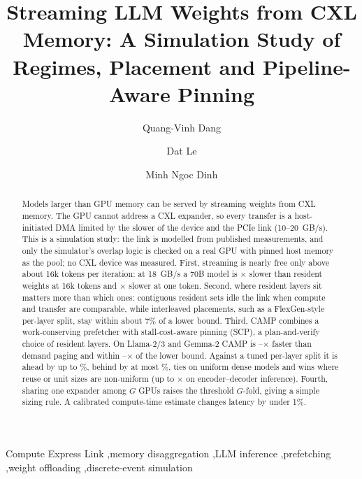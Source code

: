 \documentclass[preprint,12pt]{elsarticle}
\newcommand{\camp}{\textsc{CAMP}}
\begin{document}
\begin{frontmatter}

\title{Streaming LLM Weights from CXL Memory: A Simulation Study of Regimes, Placement and Pipeline-Aware Pinning}

\author[buv]{Quang-Vinh Dang}
\author[uef]{Dat Le}
\author[mil]{Minh Ngoc Dinh}
\address[buv]{British University Vietnam, Hung Yen, Vietnam}
\address[uef]{Department of Science, Technology, and International Projects, Ho Chi Minh City University of Economics and Finance, Ho Chi Minh City 700000, Vietnam}
\address[mil]{Millennia Education, Ho Chi Minh City, Vietnam}

\begin{abstract}
Models larger than GPU memory can be served by streaming weights from CXL memory. The GPU cannot address a CXL expander, so every transfer is a host-initiated DMA limited by the slower of the device and the PCIe link (10--20~GB/s). This is a simulation study: the link is modelled from published measurements, and only the simulator's overlap logic is checked on a real GPU with pinned host memory as the pool; no CXL device was measured. First, streaming is nearly free only above about 16k tokens per iteration: at 18~GB/s a 70B model is \nRegSlowSixteenKEighteen$\times$ slower than resident weights at 16k tokens and \nRegSlowOneEighteen$\times$ slower at one token. Second, where resident layers sit matters more than which ones: contiguous resident sets idle the link when compute and transfer are comparable, while interleaved placements, such as a FlexGen-style per-layer split, stay within about 7\% of a lower bound. Third, \camp{} combines a work-conserving prefetcher with stall-cost-aware pinning (SCP), a plan-and-verify choice of resident layers. On Llama-2/3 and Gemma-2 \camp{} is \nDemOverCampMin--\nDemOverCampMax$\times$ faster than demand paging and within \nDetLbMed--\nDetLbMax$\times$ of the lower bound. Against a tuned per-layer split it is ahead by up to \nExtOverCampMaxPct\%, behind by at most \nWorstLossExt\%, ties on uniform dense models and wins where reuse or unit sizes are non-uniform (up to \nHetEncFg$\times$ on encoder--decoder inference). Fourth, sharing one expander among $G$ GPUs raises the threshold $G$-fold, giving a simple sizing rule. A calibrated compute-time estimate changes latency by under 1\%.
\end{abstract}

\begin{keyword}
Compute Express Link \sep memory disaggregation \sep LLM inference \sep prefetching \sep weight offloading \sep discrete-event simulation
\end{keyword}

\end{frontmatter}
\end{document}
